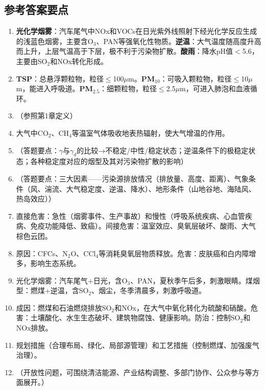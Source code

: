 \documentclass[10pt,a4paper,oneside]{ctexbook}
\begin{document}
\subsection*{参考答案要点}

\begin{enumerate}[leftmargin=*, itemsep=5pt]
    \item \textbf{光化学烟雾}：汽车尾气中NOx和VOCs在日光紫外线照射下经光化学反应生成的浅蓝色烟雾，主要含O$_3$、PAN等强氧化性物质。\textbf{逆温}：大气温度随高度升高而上升，上层气温高于下层，极不利于污染物扩散。\textbf{酸雨}：降水pH值$<$5.6，主要由SO$_2$和NOx转化形成。

    \item \textbf{TSP}：总悬浮颗粒物，粒径$\leq$100$\mu$m。\textbf{PM$_{10}$}：可吸入颗粒物，粒径$\leq$10$\mu$m，能进入呼吸道。\textbf{PM$_{2.5}$}：细颗粒物，粒径$\leq$2.5$\mu$m，可进入肺泡和血液循环。

    \item （参照第1章定义）

    \item 大气中CO$_2$、CH$_4$等温室气体吸收地表热辐射，使大气增温的作用。

    \item （答题要点：$\gamma$与$\gamma_d$的比较→不稳定/中性/稳定状态；逆温条件下的极稳定状态；各种稳定度对应的烟型及其对污染物扩散的影响）

    \item （答题要点：三大因素——污染源排放情况（排放量、高度、距离）、气象条件（风、湍流、大气稳定度、逆温、降水）、地形条件（山地谷地、海陆风、热岛效应））

    \item 直接危害：急性（烟雾事件、生产事故）和慢性（呼吸系统疾病、心血管疾病、免疫功能降低、致癌）。间接危害：温室效应、臭氧层破坏、酸雨、大气棕色云团。

    \item 原因：CFCs、N$_2$O、CCl$_4$等消耗臭氧层物质释放。危害：皮肤癌和白内障增多，影响生态系统。

    \item 光化学烟雾：汽车尾气+日光，含O$_3$、PAN，夏秋季午后多，刺激眼睛。煤烟型：燃煤+逆温，含SO$_2$、烟尘，冬季清晨多，刺激呼吸道。

    \item 成因：燃煤和石油燃烧排放SO$_2$和NOx，在大气中氧化转化为硫酸和硝酸。危害：土壤酸化、水生生态破坏、建筑物腐蚀、健康影响。防治：控制SO$_2$和NOx排放。

    \item 规划措施（合理布局、绿化、局部源管理）和工艺措施（控制燃煤、加强废气治理）。

    \item （开放性问题，可围绕清洁能源、产业结构调整、多部门协作、公众参与等方面展开。）
\end{enumerate}
\end{document}
